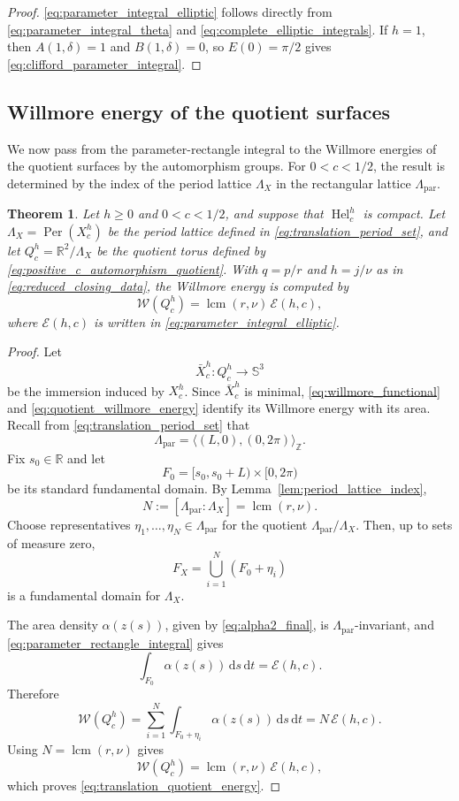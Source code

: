 \documentclass[a4paper,11pt]{amsart}
\numberwithin{equation}{section}
\theoremstyle{plain}
\newtheorem{thm}{Theorem}[section]
\newcommand{\dif}{\mathrm{d}}
\begin{document}
\begin{proof}
\eqref{eq:parameter_integral_elliptic} follows directly from
\eqref{eq:parameter_integral_theta} and \eqref{eq:complete_elliptic_integrals}. If $h=1$, then $A(1,\delta)=1$ and
$B(1,\delta)=0$, so $E(0)=\pi/2$ gives
\eqref{eq:clifford_parameter_integral}.
\end{proof}

\subsection{Willmore energy of the quotient surfaces}

We now pass from the parameter-rectangle integral to the Willmore energies
of the quotient surfaces by the automorphism groups. For $0<c<1/2$, the result is determined by the index of the period lattice
$\Lambda_X$ in the rectangular lattice $\Lambda_{\mathrm{par}}$.

\begin{thm}\label{thm:total_energy_lattice_index}
Let $h\geq0$ and $0<c<1/2$, and suppose that
$\operatorname{Hel}_c^h$ is compact.
Let $\Lambda_X=\operatorname{Per}(X_c^h)$ be the period lattice
defined in \eqref{eq:translation_period_set}, and let
$Q_c^h=\mathbb R^2/\Lambda_X$ be the quotient torus defined by
\eqref{eq:positive_c_automorphism_quotient}. With $q=p/r$ and
$h=j/\nu$ as in \eqref{eq:reduced_closing_data}, the Willmore energy is computed by
\begin{equation}\label{eq:translation_quotient_energy}
\mathcal W(Q_c^h)
=
\operatorname{lcm}(r,\nu)\,\mathcal E(h,c),
\end{equation}
where $\mathcal E(h,c)$ is written in
\eqref{eq:parameter_integral_elliptic}.
\end{thm}

\begin{proof}
Let
\[
\bar X_c^h:Q_c^h\longrightarrow\mathbb S^3
\]
be the immersion induced by $X_c^h$. Since $\bar X_c^h$ is minimal,
\eqref{eq:willmore_functional} and
\eqref{eq:quotient_willmore_energy} identify its Willmore energy with its
area. Recall from
\eqref{eq:translation_period_set} that
\[
\Lambda_{\mathrm{par}}
=
\langle(L,0),(0,2\pi)\rangle_{\mathbb Z}.
\]
Fix $s_0\in\mathbb R$ and let
\[
F_0=[s_0,s_0+L)\times[0,2\pi)
\]
be its standard fundamental domain. By Lemma~\ref{lem:period_lattice_index},
\[
N:=[\Lambda_{\mathrm{par}}:\Lambda_X]
=\operatorname{lcm}(r,\nu).
\]
Choose representatives
$\eta_1,\ldots,\eta_N\in\Lambda_{\mathrm{par}}$ for the quotient
$\Lambda_{\mathrm{par}}/\Lambda_X$. Then, up to sets of measure zero,
\[
F_X
=
\bigcup_{i=1}^N(F_0+\eta_i)
\]
is a fundamental domain for $\Lambda_X$.

The area density $\alpha(z(s))$, given by
\eqref{eq:alpha2_final}, is $\Lambda_{\mathrm{par}}$-invariant, and
\eqref{eq:parameter_rectangle_integral} gives
\[
\int_{F_0}\alpha(z(s))\,\dif s\,\dif t=\mathcal E(h,c).
\]
Therefore
\[
\mathcal W(Q_c^h)
=
\sum_{i=1}^N
\int_{F_0+\eta_i}\alpha(z(s))\,\dif s\,\dif t
=
N\,\mathcal E(h,c).
\]
Using $N=\operatorname{lcm}(r,\nu)$ gives
\[
\mathcal W(Q_c^h)
=
\operatorname{lcm}(r,\nu)\,\mathcal E(h,c),
\]
which proves \eqref{eq:translation_quotient_energy}.
\end{proof}
\end{document}
